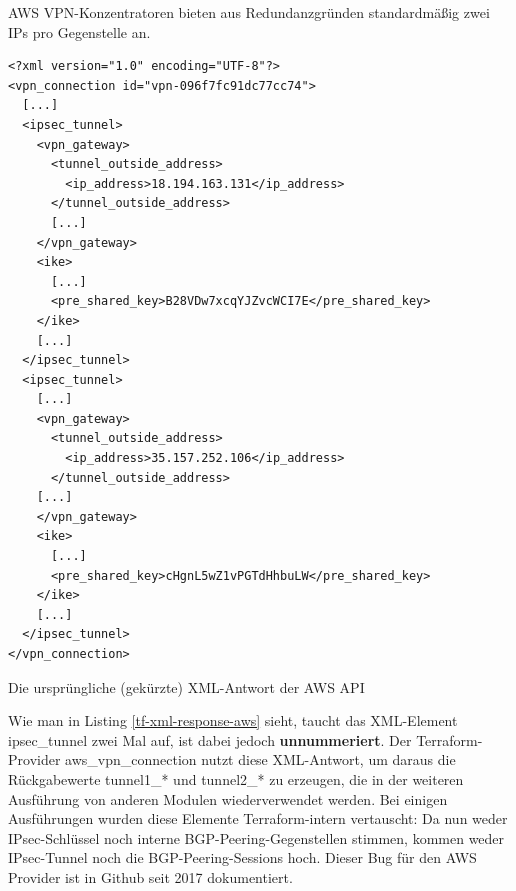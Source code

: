AWS VPN-Konzentratoren bieten aus Redundanzgründen standardmäßig zwei IPs pro Gegenstelle an. 
\begin{listing}[h]
\begin{verbatim}
<?xml version="1.0" encoding="UTF-8"?>
<vpn_connection id="vpn-096f7fc91dc77cc74">
  [...]
  <ipsec_tunnel>
    <vpn_gateway>
      <tunnel_outside_address>
        <ip_address>18.194.163.131</ip_address>
      </tunnel_outside_address>
      [...]
    </vpn_gateway>
    <ike>
      [...]
      <pre_shared_key>B28VDw7xcqYJZvcWCI7E</pre_shared_key>
    </ike>
    [...]
  </ipsec_tunnel>
  <ipsec_tunnel>
    [...]
    <vpn_gateway>
      <tunnel_outside_address>
        <ip_address>35.157.252.106</ip_address>
      </tunnel_outside_address>
    [...]
    </vpn_gateway>
    <ike>
      [...]
      <pre_shared_key>cHgnL5wZ1vPGTdHhbuLW</pre_shared_key>
    </ike>
    [...]
  </ipsec_tunnel>
</vpn_connection>

\end{verbatim}
\caption{Die ursprüngliche (gekürzte) XML-Antwort der AWS API}
\label{tf-xml-response-aws}
\end{listing}\FloatBarrier
Wie man in Listing \ref{tf-xml-response-aws} sieht, taucht das XML-Element ipsec\_tunnel zwei Mal auf, ist dabei jedoch \textbf{unnummeriert}.
Der Terraform-Provider aws\_vpn\_connection nutzt diese XML-Antwort, um daraus die Rückgabewerte tunnel1\_* und tunnel2\_* zu erzeugen\cite{awsattributestf2021}, die in der weiteren Ausführung von anderen Modulen wiederverwendet werden. Bei einigen Ausführungen wurden diese Elemente Terraform-intern vertauscht: Da nun weder IPsec-Schlüssel noch interne BGP-Peering-Gegenstellen stimmen, kommen weder IPsec-Tunnel noch die BGP-Peering-Sessions hoch. Dieser Bug für den AWS Provider ist in Github seit 2017 dokumentiert\cite{githubbugtf2021}.

